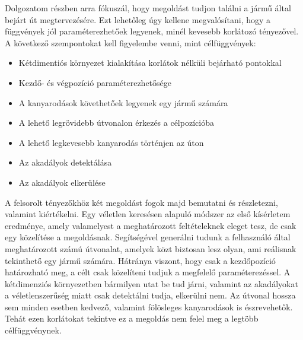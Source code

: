 

\begin{comment}
Az alapvető cél, amit el szeretnénk érni, az találni egy optimális útvonalat, amely az akadályokat kikerülve eljuttatja a járművet valahová. Több megoldást is be fogok mutatni, az egyszerűbbektől a bonyolultabbakig. A kísérletek eredményei is láthatóak lesznek, melyek véletlenszerűen generált útvonalakat fognak ábrázolni bizonyos paraméterek alapján. Ezek után konkrét algoritmusokat fogok definiálni és bemutatni, melyek már tényleges optimumot adnak és adott kezdőpontból adott végpontba juttatják a járművet.
\end{comment}

Dolgozatom részben arra fókuszál, hogy megoldást tudjon találni a jármű által bejárt út megtervezésére. Ezt lehetőleg úgy kellene megvalósítani, hogy a függvények jól paraméterezhetőek legyenek, minél kevesebb korlátozó tényezővel. A következő szempontokat kell figyelembe venni, mint célfüggvények:
\begin{itemize}
	\item Kétdimentiós környezet kialakítása korlátok nélküli bejárható pontokkal
	\item Kezdő- és végpozíció paraméterezhetősége
	\item A kanyarodások követhetőek legyenek egy jármű számára
	\item A lehető legrövidebb útvonalon érkezés a célpozícióba
	\item A lehető legkevesebb kanyarodás történjen az úton
	\item Az akadályok detektálása
	\item Az akadályok elkerülése
\end{itemize}

A felsorolt tényezőkhöz két megoldást fogok majd bemutatni és részletezni, valamint kiértékelni. Egy véletlen keresésen alapuló módszer az első kísérletem eredménye, amely valamelyest a meghatározott feltételeknek eleget tesz, de csak egy közelítése a megoldásnak. Segítségével generálni tudunk a felhasználó által meghatározott számú útvonalat, amelyek közt biztosan lesz olyan, ami reálisnak tekinthető egy jármű számára. Hátránya viszont, hogy csak a kezdőpozíció határozható meg, a célt csak közelíteni tudjuk a megfelelő paraméterezéssel. A kétdimenziós környezetben bármilyen utat be tud járni, valamint az akadályokat a véletlenszerűség miatt csak detektálni tudja, elkerülni nem. Az útvonal hossza sem minden esetben kedvező, valamint fölösleges kanyarodások is észrevehetők. Tehát ezen korlátokat tekintve ez a megoldás nem felel meg a legtöbb célfüggvénynek.
\\\\

